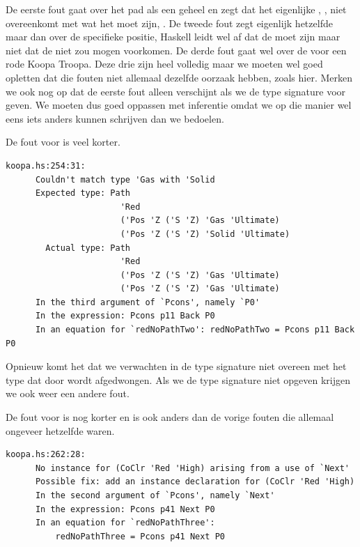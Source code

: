 De eerste fout gaat over het pad als een geheel en zegt dat het eigenlijke
, , niet overeenkomt met wat het moet zijn,
. De tweede fout zegt eigenlijk hetzelfde maar dan over de
specifieke positie, Haskell leidt wel af dat de  
moet zijn maar niet dat de   niet zou mogen
voorkomen. De derde fout gaat wel over de  voor een rode Koopa
Troopa. Deze drie zijn heel volledig maar we moeten wel goed opletten dat die
fouten niet allemaal dezelfde oorzaak hebben, zoals hier. Merken we ook nog op
dat de eerste fout alleen verschijnt als we de type signature voor
 geven. We moeten dus goed oppassen met inferentie omdat we
op die manier wel eens iets anders kunnen schrijven dan we bedoelen.

De fout voor  is veel korter.

\begin{Verbatim}[fontsize=\small]
  koopa.hs:254:31:
      Couldn't match type 'Gas with 'Solid
      Expected type: Path
                       'Red
                       ('Pos 'Z ('S 'Z) 'Gas 'Ultimate)
                       ('Pos 'Z ('S 'Z) 'Solid 'Ultimate)
        Actual type: Path
                       'Red
                       ('Pos 'Z ('S 'Z) 'Gas 'Ultimate)
                       ('Pos 'Z ('S 'Z) 'Gas 'Ultimate)
      In the third argument of `Pcons', namely `P0'
      In the expression: Pcons p11 Back P0
      In an equation for `redNoPathTwo': redNoPathTwo = Pcons p11 Back P0
\end{Verbatim}

Opnieuw komt het  dat we verwachten in de type signature niet
overeen met het type dat door  wordt afgedwongen. Als we de type
signature niet opgeven krijgen we ook weer een andere fout.

De fout voor  is nog korter en is ook anders dan de
vorige fouten die allemaal ongeveer hetzelfde waren.

\begin{Verbatim}[fontsize=\small]
  koopa.hs:262:28:
      No instance for (CoClr 'Red 'High) arising from a use of `Next'
      Possible fix: add an instance declaration for (CoClr 'Red 'High)
      In the second argument of `Pcons', namely `Next'
      In the expression: Pcons p41 Next P0
      In an equation for `redNoPathThree':
          redNoPathThree = Pcons p41 Next P0
\end{Verbatim}

